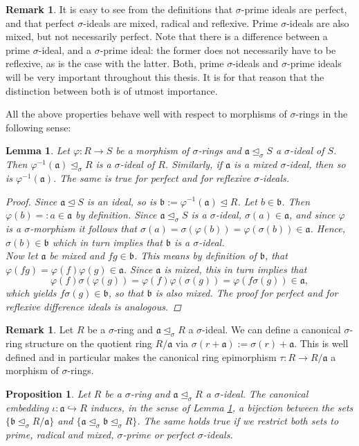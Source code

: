 \documentclass{article}
\def\a{\mathfrak{a}}
\def\b{\mathfrak{b}}
\def\s{\sigma}
\def\si{\unlhd_{\sigma}}
\newenvironment{bew}{\begin{proof}[Proof]}{\end{proof}}
\theoremstyle{plain}
\newtheorem{prop}[Satz]{Proposition}
\newtheorem{lem}[Satz]{Lemma}
\theoremstyle{definition}
\newtheorem{rem}[Satz]{Remark}
\begin{document}
\begin{rem}
It is easy to see from the definitions that $\s$-prime ideals are perfect, and that perfect $\s$-ideals are mixed, radical and reflexive. Prime $\s$-ideals are also mixed, but not necessarily perfect. Note that there is a difference between a prime $\s$-ideal, and a $\s$-prime ideal:
the former does not necessarily have to be reflexive, as is the case with the latter. Both, prime $\s$-ideals and $\s$-prime ideals will be very important throughout this thesis. It is for that reason that the distinction between both is of utmost importance.
\end{rem}

All the above properties behave well with respect to morphisms of $\s$-rings in the following sense:
\begin{lem}\label{bijmapping}
Let $\varphi: R \rightarrow S$ be a morphism of $\s$-rings and $\a \si S$ a $\s$-ideal of $S$. Then $\varphi^{-1}(\a) \si R$ is a $\s$-ideal of $R$. Similarly, if $\a$ is a mixed $\s$-ideal, then so is $\varphi^{-1}(\a)$. The same is true for perfect and for reflexive $\s$-ideals.
\begin{bew}
Since $\a \unlhd S$ is an ideal, so is $\b := \varphi^{-1}(\a) \unlhd R$. Let $b \in \b$. Then $\varphi(b) =: a \in \a$ by definition. Since $\a \si S$ is a $\s$-ideal, $\s(a) \in \a$, and since $\varphi$ is a $\s$-morphism
it follows that $\sigma(a) = \sigma(\varphi(b)) = \varphi (\s (b)) \in \a$. Hence, $\s(b) \in \b$ which in turn implies that $\b$ is a $\s$-ideal. \\
Now let $\a$ be mixed and $fg \in \b$. This means by definition of $\b$, 
that $\varphi(fg) = \varphi(f) \varphi(g) \in \a$. Since $\a$ is mixed, this in turn implies that $$\varphi(f) \s( \varphi(g)) = \varphi(f) \varphi(\s(g)) = \varphi(f\s(g)) \in \a,$$ which yields $f\s(g) \in \b$, so that $\b$ is also mixed. 
The proof for perfect and for reflexive difference ideals is analogous.
\end{bew}
\end{lem}

\begin{rem}
Let $R$ be a $\s$-ring and $\a \si R$ a $\s$-ideal. We can define a canonical $\s$-ring structure on the quotient ring $R/\a$ via $\s(r+\a):= \s(r) + \a$. 
This is well defined and in particular makes the canonical ring epimorphism $\tau: R \rightarrow R/\a$ a morphism of $\s$-rings.
\end{rem}

\begin{prop}\label{bijideals}
Let $R$ be a $\s$-ring and $\a \si R$ a $\s$-ideal. The canonical embedding $\iota: \a \hookrightarrow R$ induces, in the sense of Lemma \ref{bijmapping}, a bijection between the sets $\{ \b \si R/\a \}$ and $\{ \a \si \b \si R \}$. The same holds true if we restrict both sets to prime, radical and mixed, $\s$-prime or perfect $\s$-ideals.
\end{prop}
\end{document}
